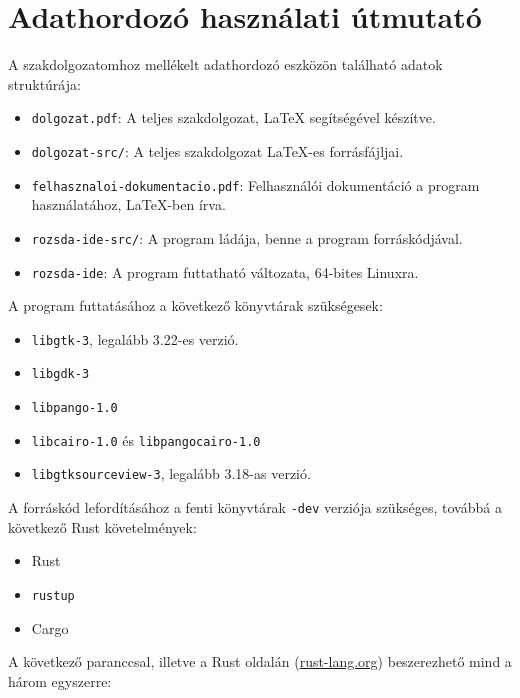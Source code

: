 \chapter*{Adathordozó használati útmutató}



\noindent A szakdolgozatomhoz mellékelt adathordozó eszközön található adatok struktúrája:

\begin{itemize}
    \item \texttt{dolgozat.pdf}: A teljes szakdolgozat, \LaTeX{} segítségével készítve.
    \item \texttt{dolgozat-src/}: A teljes szakdolgozat \LaTeX{}-es forrásfájljai. 
    \item \texttt{felhasznaloi-dokumentacio.pdf}: Felhasználói dokumentáció a program használatához, \LaTeX{}-ben írva.
    \item \texttt{rozsda-ide-src/}: A program ládája, benne a program forráskódjával.
    \item \texttt{rozsda-ide}: A program futtatható változata, 64-bites Linuxra.
\end{itemize}

\noindent A program futtatásához a következő könyvtárak szükségesek:

\begin{itemize}
    \item \texttt{libgtk-3}, legalább 3.22-es verzió.
    \item \texttt{libgdk-3}
    \item \texttt{libpango-1.0}
    \item \texttt{libcairo-1.0} és \texttt{libpangocairo-1.0}
    \item \texttt{libgtksourceview-3}, legalább 3.18-as verzió.
\end{itemize}

\noindent A forráskód lefordításához a fenti könyvtárak \texttt{-dev} verziója szükséges,
továbbá a következő Rust követelmények:

\begin{itemize}
    \item Rust
    \item \texttt{rustup}
    \item Cargo
\end{itemize}

\noindent A következő paranccsal, illetve a Rust oldalán (\url{rust-lang.org})
beszerezhető mind a három egyszerre: 